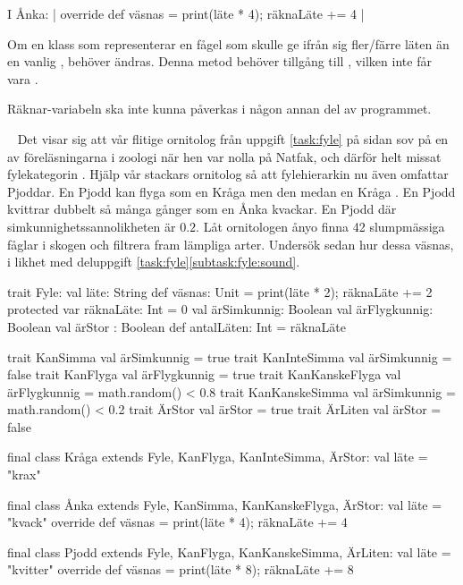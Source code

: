 I Ånka: \code| override def väsnas = { print(läte * 4); räknaLäte += 4 }|

\SubtaskSolved  {}

\SubtaskSolved  Om en klass som representerar en fågel som skulle ge ifrån sig fler/färre läten än en vanlig , behöver  ändras. Denna metod behöver tillgång till , vilken inte får vara .

\SubtaskSolved  Räknar-variabeln ska inte kunna påverkas i någon annan del av programmet.


\QUESTEND






\QUESTBEGIN

\Task  \what~ Det visar sig att vår flitige ornitolog från uppgift \ref{task:fyle} på sidan \pageref{task:fyle} sov på en av föreläsningarna i zoologi när hen var nolla på Natfak, och därför helt missat fylekategorin . Hjälp vår stackars ornitolog så att fylehierarkin nu även omfattar Pjoddar. En Pjodd kan flyga som en Kråga men den  medan en Kråga . En Pjodd kvittrar dubbelt så många gånger som en Ånka kvackar. En Pjodd  där simkunnighetssannolikheten är $0.2$. Låt ornitologen ånyo finna 42 slumpmässiga fåglar i skogen och filtrera fram lämpliga arter. Undersök sedan hur dessa väsnas, i likhet med deluppgift \ref{task:fyle}\ref{subtask:fyle:sound}.


\SOLUTION

\TaskSolved \what


\begin{Code}
trait Fyle:
  val läte: String
  def väsnas: Unit = { print(läte * 2); räknaLäte += 2 }
  protected var räknaLäte: Int = 0
  val ärSimkunnig: Boolean
  val ärFlygkunnig: Boolean
  val ärStor : Boolean
  def antalLäten: Int = räknaLäte

trait KanSimma { val ärSimkunnig = true }
trait KanInteSimma { val ärSimkunnig = false }
trait KanFlyga { val ärFlygkunnig = true }
trait KanKanskeFlyga { val ärFlygkunnig = math.random() < 0.8 }
trait KanKanskeSimma { val ärSimkunnig = math.random() < 0.2 }
trait ÄrStor { val ärStor = true }
trait ÄrLiten { val ärStor = false }

final class Kråga extends Fyle, KanFlyga, KanInteSimma, ÄrStor:
  val läte = "krax"

final class Ånka extends Fyle, KanSimma, KanKanskeFlyga, ÄrStor:
  val läte = "kvack"
  override def väsnas = { print(läte * 4); räknaLäte += 4 }

final class Pjodd extends Fyle, KanFlyga, KanKanskeSimma, ÄrLiten:
  val läte = "kvitter"
  override def väsnas = { print(läte * 8); räknaLäte += 8 }
\end{Code}

